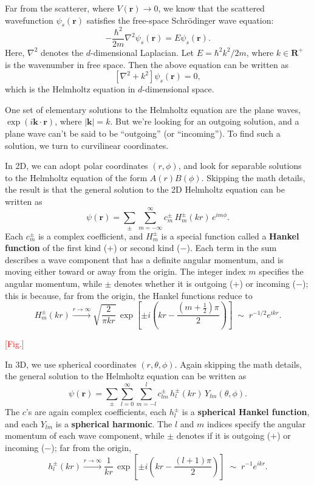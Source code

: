\documentclass[pra,12pt]{revtex4}
\begin{document}
Far from the scatterer, where $V(\mathbf{r})\rightarrow 0$, we know
that the scattered wavefunction $\psi_s(\mathbf{r})$ satisfies the
free-space Schr\"odinger wave equation:
$$-\frac{\hbar^2}{2m} \nabla^2 \psi_s(\mathbf{r}) = E \psi_s(\mathbf{r}).$$
Here, $\nabla^2$ denotes the $d$-dimensional Laplacian.  Let $E =
\hbar^2 k^2 / 2m$, where $k \in \mathbf{R}^+$ is the wavenumber in
free space.  Then the above equation can be written as
$$\left[\nabla^2 + k^2\right] \psi_s(\mathbf{r}) = 0,$$
which is the Helmholtz equation in $d$-dimensional space.

One set of elementary solutions to the Helmholtz equation are the
plane waves, $\exp(i\mathbf{k}\cdot\mathbf{r})$, where $|\mathbf{k}| =
k$.  But we're looking for an outgoing solution, and a plane wave
can't be said to be ``outgoing'' (or ``incoming'').  To find such a
solution, we turn to curvilinear coordinates.

In 2D, we can adopt polar coordinates $(r,\phi)$, and look for
separable solutions to the Helmholtz equation of the form
$A(r)B(\phi)$.  Skipping the math details, the result is that the
general solution to the 2D Helmholtz equation can be written as
$$\psi(\mathbf{r})=\sum_{\pm}\sum_{m=-\infty}^\infty c_m^\pm\,H_m^\pm(kr)\,e^{im\phi}.$$
Each $c_m^\pm$ is a complex coefficient, and $H_m^\pm$ is a special
function called a \textbf{Hankel function} of the first kind ($+$) or second
kind ($-$).  Each term in the sum describes a wave component that has a
definite angular momentum, and is moving either toward or away from the
origin.  The integer index $m$ specifies the angular momentum, while
$\pm$ denotes whether it is outgoing ($+$) or incoming ($-$); this is
because, far from the origin, the Hankel functions reduce to
$$H_m^\pm(kr) \overset{r\rightarrow\infty}{\longrightarrow} \sqrt{\frac{2}{\pi kr}} \, \exp\left[\pm i\left(kr - \frac{(m+\frac{1}{2})\pi}{2}\right)\right] \;\sim\; r^{-1/2} e^{ikr}.$$

\textcolor{red}{[Fig.]}

In 3D, we use spherical coordinates $(r,\theta,\phi)$.  Again skipping
the math details, the general solution to the Helmholtz equation can
be written as
$$\psi(\mathbf{r})=\sum_{\pm}\sum_{l=0}^\infty\sum_{m=-l}^lc_{lm}^\pm\,h_l^\pm(kr)\,Y_{lm}(\theta,\phi).$$
The $c$'s are again complex coefficients, each $h_l^\pm$ is a
\textbf{spherical Hankel function}, and each $Y_{lm}$ is a
\textbf{spherical harmonic}.  The $l$ and $m$ indices specify the
angular momentum of each wave component, while $\pm$ denotes if it is
outgoing ($+$) or incoming ($-$); far from the origin,
$$h_l^\pm(kr) \overset{r\rightarrow\infty}{\longrightarrow} \frac{1}{kr}\,\exp\left[\pm i\left(kr-\frac{(l+1)\pi}{2}\right)\right] \;\sim\; r^{-1} e^{ikr}.$$
\end{document}
